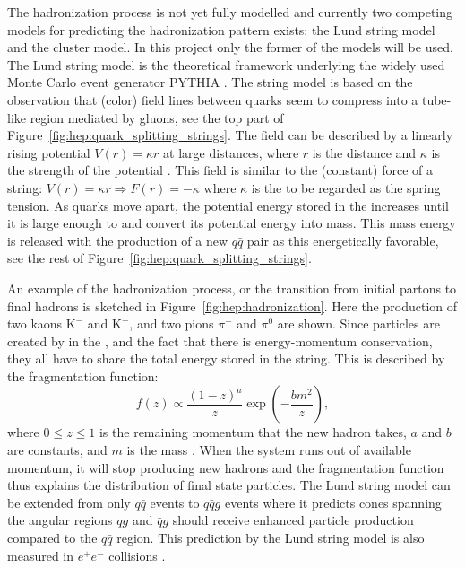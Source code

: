 The hadronization process is not yet fully modelled and currently two competing models for predicting the hadronization pattern exists: the Lund string model and the cluster model. In this project only the former of the models will be used. The Lund string model \autocite{anderssonPartonFragmentationString1983} is the theoretical framework underlying the widely used Monte Carlo event generator PYTHIA \autocite{sjostrandIntroductionPYTHIA2015}. The string model is based on the observation that (color) field lines between quarks seem to compress into a tube-like region mediated by gluons, see the top part of Figure~\ref{fig:hep:quark_splitting_strings}. The field can be described by a linearly rising potential $V(r)=\kappa r$ at large distances, where $r$ is the distance and $\kappa$ is the strength of the potential \autocite{buckleyGeneralpurposeEventGenerators2011}. This field is similar to the (constant) force of a string: $V(r)=\kappa r \Rightarrow F(r) = -\kappa$ where $\kappa$ is the to be regarded as the spring tension. As quarks move apart, the potential energy stored in the  increases until it is large enough to  and convert its potential energy into mass. This mass energy is released with the production of a new $q\bar{q}$ pair as this energetically favorable, see the rest of Figure~\ref{fig:hep:quark_splitting_strings}. 

An example of the hadronization process, or the transition from initial partons to final hadrons is sketched in Figure~\ref{fig:hep:hadronization}. Here the production of two kaons $\mathrm{K}^-$ and $\mathrm{K}^+$, and two pions $\pi^-$ and $\pi^0$ are shown. Since particles are created by  in the , and the fact that there is energy-momentum conservation, they all have to share the total energy stored in the string. This is described by the fragmentation function:
\begin{equation}
  f(z) \propto \frac{(1-z)^a}{z} \exp \left(- \frac{b m^2}{z} \right),
\end{equation}
where $0 \leq z \leq 1$ is the remaining momentum that the new hadron takes, $a$ and $b$ are constants, and $m$ is the mass \autocite{bierlichRopeHadronizationGeometry2016}. When the system runs out of available momentum, it will stop producing new hadrons and the fragmentation function thus explains the distribution of final state particles. The Lund string model can be extended from only $q\bar{q}$ events to $q\bar{q}g$ events where it predicts cones spanning the angular regions $qg$ and $\bar{q}g$ should receive enhanced particle production compared to the $q\bar{q}$ region. This prediction by the Lund string model is also measured in $e^+e^-$ collisions \autocite{buckleyGeneralpurposeEventGenerators2011}.

